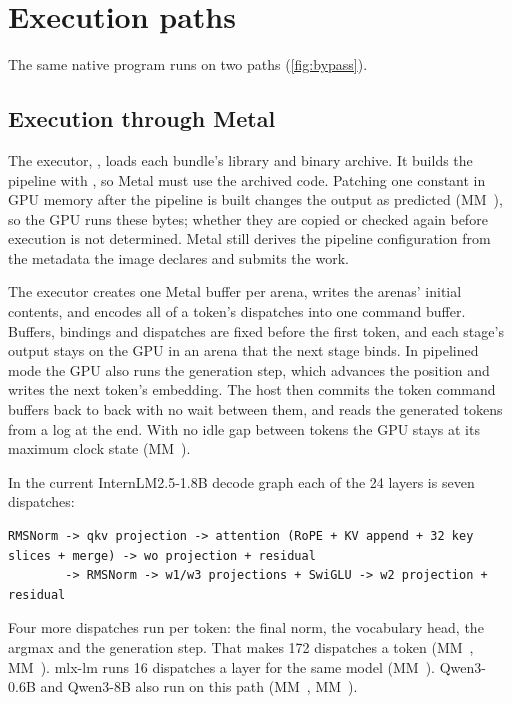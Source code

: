 \chapter{Execution paths}\label{ch:executing}

The same native program runs on two paths (\cref{fig:bypass}).

\section{Execution through Metal}\label{ch:through-metal}

The executor, , loads each bundle's library and
binary archive. It builds the pipeline with , so Metal must use the
archived code. Patching one constant in GPU memory after the pipeline is built changes the output as predicted
(MM~), so the GPU runs these bytes; whether they are copied or checked again before execution is not
determined. Metal still derives the pipeline configuration from the metadata the image declares and submits the work.

The executor creates one Metal buffer per arena, writes the arenas' initial contents, and encodes all of a token's
dispatches into one command buffer. Buffers, bindings and dispatches are fixed before the first token, and each
stage's output stays on the GPU in an arena that the next stage binds. In pipelined mode the GPU also runs the generation step, which advances
the position and writes the next token's embedding. The host then commits the token command buffers back to back
with no wait between them, and reads the generated tokens from a log at the end. With no idle gap between tokens the
GPU stays at its maximum clock state (MM~).

In the current InternLM2.5-1.8B decode graph each of the 24 layers is seven dispatches:

\begin{lstlisting}
RMSNorm -> qkv projection -> attention (RoPE + KV append + 32 key slices + merge) -> wo projection + residual
        -> RMSNorm -> w1/w3 projections + SwiGLU -> w2 projection + residual
\end{lstlisting}

Four more dispatches run per token: the final norm, the vocabulary head, the argmax and the generation step. That
makes 172 dispatches a token (MM~, MM~). mlx-lm runs 16 dispatches a layer for the same model
(MM~). Qwen3-0.6B and Qwen3-8B also run on this path (MM~, MM~).

